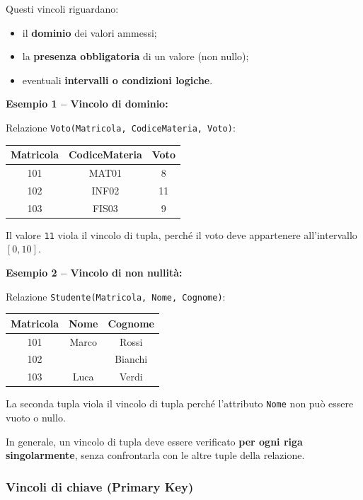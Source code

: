 \documentclass[a4paper,12pt]{article}
\begin{document}
Questi vincoli riguardano:
\begin{itemize}
    \item il \textbf{dominio} dei valori ammessi;
    \item la \textbf{presenza obbligatoria} di un valore (non nullo);
    \item eventuali \textbf{intervalli o condizioni logiche}.
\end{itemize}

\textbf{Esempio 1 -- Vincolo di dominio:}

Relazione \texttt{Voto(Matricola, CodiceMateria, Voto)}:
\begin{center}
\begin{tabular}{|c|c|c|}
\hline
\textbf{Matricola} & \textbf{CodiceMateria} & \textbf{Voto} \\
\hline
101 & MAT01 & 8 \\
102 & INF02 & 11 \\
103 & FIS03 & 9 \\
\hline
\end{tabular}
\end{center}

Il valore \texttt{11} viola il vincolo di tupla, perché il voto deve appartenere all’intervallo \([0,10]\).

\bigskip

\textbf{Esempio 2 -- Vincolo di non nullità:}

Relazione \texttt{Studente(Matricola, Nome, Cognome)}:
\begin{center}
\begin{tabular}{|c|c|c|}
\hline
\textbf{Matricola} & \textbf{Nome} & \textbf{Cognome} \\
\hline
101 & Marco & Rossi \\
102 &  & Bianchi \\
103 & Luca & Verdi \\
\hline
\end{tabular}
\end{center}

La seconda tupla viola il vincolo di tupla perché l’attributo \texttt{Nome} non può essere vuoto o nullo.

\bigskip

In generale, un vincolo di tupla deve essere verificato \textbf{per ogni riga singolarmente}, senza confrontarla con le altre tuple della relazione.
\subsubsection{Vincoli di chiave (Primary Key)}
\end{document}
